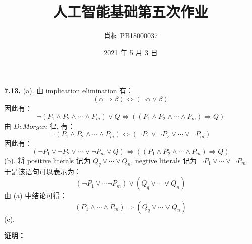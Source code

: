 \documentclass[UTF8]{ctexart}
\begin{document}
    \title{人工智能基础第五次作业}
    \author{肖桐 PB18000037}
    \date{2021 年 5 月 3 日}
    \maketitle

    \textnormal{\textbf{7.13.}}\newline
    (a). 由 implication elimination 有：
    $$
    (\alpha \Rightarrow \beta) \Leftrightarrow (\neg\alpha \vee \beta)
    $$
    因此有：
    $$
    \neg(P_1 \wedge P_2 \wedge \cdots \wedge P_m) \vee Q \Leftrightarrow ((P_1 \wedge P_2 \wedge \cdots \wedge P_m) \Rightarrow Q)
    $$
    由 $De Morgan$ 律, 有：
    $$
    \neg(P_1 \wedge P_2 \wedge \cdots \wedge P_m) \Leftrightarrow (\neg P_1 \vee \neg P_2 \vee \cdots \vee \neg P_m)
    $$
    因此有：
    $$
    (\neg P_1 \vee \neg P_2 \vee \cdots \vee \neg P_m \vee Q) \Leftrightarrow ((P_1 \wedge P_2 \wedge \cdots \wedge P_m) \Rightarrow Q)
    $$
    (b). 将 positive literals 记为 $Q_q \vee \cdots \vee Q_n$, negtive literals 记为 $\neg P_1 \vee \cdots \vee \neg P_m$.\newline
    于是该语句可以表示为：
    $$
    (\neg P_1 \vee \cdots \neg P_m) \vee (Q_q \vee \cdots \vee Q_n)
    $$
    由 (a) 中结论可得：
    $$
    (P_1 \wedge \cdots \wedge P_m) \Rightarrow (Q_q \vee \cdots \vee Q_n)
    $$
    (c). 

    \textnormal{\textbf{证明：}}
    
\end{document}
